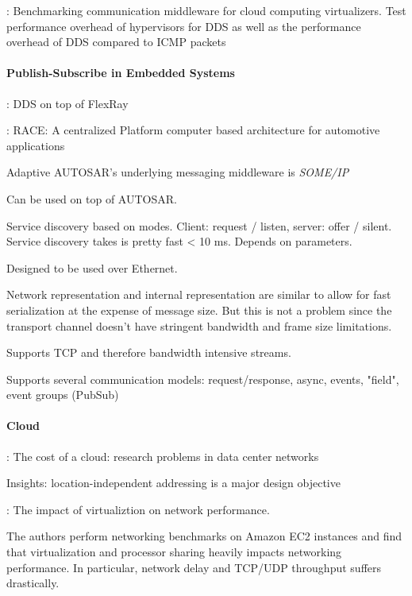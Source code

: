 \cite{garcia2013benchmarking}: Benchmarking communication middleware for cloud computing virtualizers. Test performance overhead of hypervisors for DDS as well as the performance overhead of DDS compared to ICMP packets

\paragraph{Publish-Subscribe in Embedded Systems}

\cite{bouhouch2013dds}: DDS on top of FlexRay

\cite{sommer2013race}: RACE: A centralized Platform computer based architecture for automotive applications


Adaptive AUTOSAR's underlying messaging middleware is \emph{SOME/IP}

Can be used on top of AUTOSAR.

Service discovery based on modes. Client: request / listen, server: offer / silent.
Service discovery takes is pretty fast < 10 ms. Depends on parameters.

Designed to be used over Ethernet.

Network representation and internal representation are similar to allow for fast serialization at the expense of message size. But this is not a problem since the transport channel doesn't have stringent bandwidth and frame size limitations.

Supports TCP and therefore bandwidth intensive streams.

Supports several communication models: request/response, async, events, "field", event groups (PubSub)


\paragraph{Cloud}

\cite{greenberg2008cost}: The cost of a cloud: research problems in data center networks

Insights: location-independent addressing is a major design objective

\cite{wang2010impact}: The impact of virtualiztion on network performance.

The authors perform networking benchmarks on Amazon EC2 instances and find that virtualization and processor sharing heavily impacts networking performance. In particular, network delay and TCP/UDP throughput suffers drastically.


